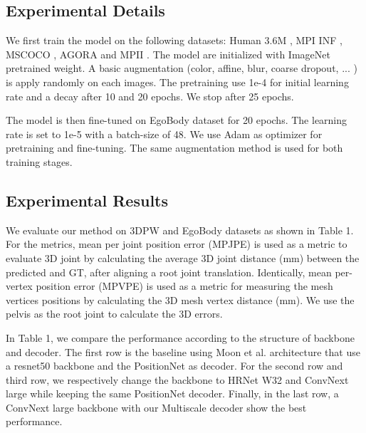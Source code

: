 \documentclass[runningheads]{llncs}
\begin{document}
\subsection{Experimental Details}

We first train the model on the following datasets: Human 3.6M \cite{h36m_pami}, MPI INF \cite{mono-3dhp2017}, MSCOCO \cite{mscoco}, AGORA \cite{Patel:CVPR:2021} and MPII \cite{andriluka14cvpr}. The model are initialized with ImageNet pretrained weight.
A basic augmentation (color, affine, blur, coarse dropout, ... ) is apply randomly on each images.
The pretraining use 1e-4 for initial learning rate and a decay after 10 and 20 epochs. We stop after 25 epochs.

The model is then fine-tuned on EgoBody \cite{Zhang:ECCV:2022} dataset for 20 epochs. The learning rate is set to 1e-5 with a batch-size of 48. We use Adam as optimizer for pretraining and fine-tuning. The same augmentation method is used for both training stages.





\subsection{Experimental Results}


We evaluate our method on 3DPW \cite{vonMarcard2018} and EgoBody \cite{Zhang:ECCV:2022} datasets as shown in Table 1.
For the metrics, mean per joint position error (MPJPE) is used as a metric to evaluate 3D joint by calculating the average 3D joint distance (mm) between the predicted and GT, after aligning a root joint translation. Identically, mean per-vertex position error (MPVPE) is used as a metric for measuring the mesh vertices positions by calculating the 3D mesh vertex distance (mm). We use the pelvis as the root joint to calculate the 3D errors.

In Table 1, we compare the performance according to the structure of backbone and decoder. 
The first row is the baseline using Moon et al. \cite{Moon_2022_CVPRW_Hand4Whole} architecture that use a resnet50 \cite{resnet} backbone and the PositionNet as decoder. For the second row and third row, we respectively change the backbone to HRNet W32 \cite{hrnet} and ConvNext \cite{liu2022convnet} large while keeping the same PositionNet decoder.
Finally, in the last row, a ConvNext \cite{liu2022convnet} large backbone with our Multiscale decoder show the best performance.
\end{document}
